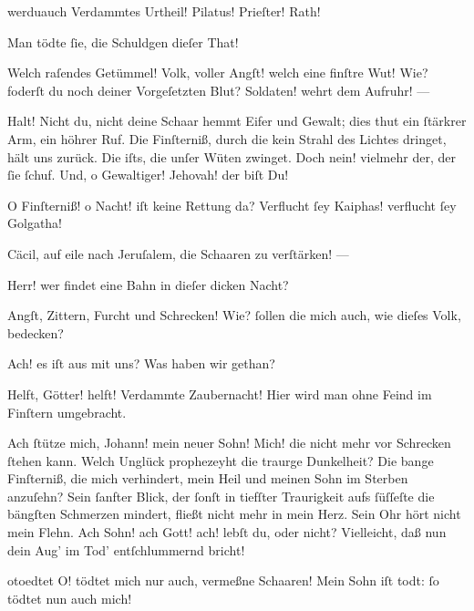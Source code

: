 \documentclass{ees}
\begin{document}
{\begin{movement}{werduauch}
    Verdammtes Urtheil! Pilatus! Prieſter! Rath!

    Man tödte ſie, die Schuldgen dieſer That!

    Welch raſendes Getümmel!
    Volk, voller Angſt! welch eine finſtre Wut!
    Wie? foderſt du noch deiner Vorgeſetzten Blut?
    Soldaten! wehrt dem Aufruhr! —

    \hspace*{3cm}Halt!
    Nicht du, nicht deine Schaar hemmt Eifer und Gewalt;
    dies thut ein ſtärkrer Arm, ein höhrer Ruf.
    Die Finſterniß, durch die kein Strahl des Lichtes dringet,
    hält uns zurück. Die iſts, die unſer Wüten zwinget.
    Doch nein! vielmehr der, der ſie ſchuf.
    Und, o Gewaltiger! Jehovah! der biſt Du!

    O Finſterniß! o Nacht! iſt keine Rettung da?
    Verflucht ſey Kaiphas! verflucht ſey Golgatha!

    Cäcil, auf eile nach Jeruſalem,
    die Schaaren zu verſtärken! —

    \hspace*{3cm}Herr! wer findet eine Bahn
    in dieſer dicken Nacht?

    \hspace*{3cm}Angſt, Zittern, Furcht und Schrecken!
    Wie? ſollen die mich auch, wie dieſes Volk, bedecken?

    Ach! es iſt aus mit uns? Was haben wir gethan?

    Helft, Götter! helft! Verdammte Zaubernacht!
    Hier wird man ohne Feind im Finſtern umgebracht.

    \voice[Maria]
    Ach ſtütze mich, Johann! mein neuer Sohn!
    Mich! die nicht mehr vor Schrecken ſtehen kann.
    Welch Unglück prophezeyht die traurge Dunkelheit?
    Die bange Finſterniß, die mich verhindert,
    mein Heil und meinen Sohn im Sterben anzuſehn?
    Sein ſanfter Blick, der ſonſt in tiefſter Traurigkeit
    aufs ſüſſeſte die bängſten Schmerzen mindert,
    fließt nicht mehr in mein Herz. Sein Ohr hört nicht mein Flehn.
    Ach Sohn! ach Gott! ach! lebſt du, oder nicht?
    Vielleicht, daß nun dein Aug’ im Tod’ entſchlummernd bricht!
  \end{movement}

  \begin{movement}{otoedtet}
    \voice[Maria]
    O! tödtet mich nur auch, vermeßne Schaaren!
    Mein Sohn iſt todt: ſo tödtet nun auch mich!


\end{movement}}
\end{document}
